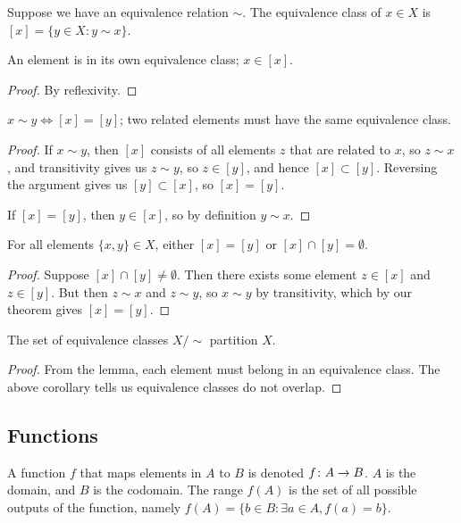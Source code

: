 \begin{definition}
    Suppose we have an equivalence relation \(\sim\).
    The equivalence class of \(x \in X\) is
    \([x] = \{y \in X : y \sim x\}\).
\end{definition}
\begin{lemma}
    An element is in its own equivalence class; \(x \in [x]\).
\end{lemma}
\begin{proof}
    By reflexivity.
\end{proof}
\begin{theorem}
    \(x \sim y \iff [x] = [y]\);
    two related elements must have the same equivalence class.
\end{theorem}
\begin{proof}
    If \(x \sim y\),
    then \([x]\) consists of all elements \(z\) that are related to \(x\),
    so \(z \sim x\), and transitivity gives us \(z \sim y\),
    so \(z \in [y]\), and hence \([x] \subset [y]\).
    Reversing the argument gives us \([y] \subset [x]\),
    so \([x] = [y]\).

    If \([x] = [y]\), then \(y \in [x]\),
    so by definition \(y \sim x\).
\end{proof}
\begin{corollary}
    For all elements \(\{x,y\} \in X\),
    either \([x] = [y]\) or \([x] \cap [y] = \emptyset\).
\end{corollary}
\begin{proof}
    Suppose \([x] \cap [y] \neq \emptyset\).
    Then there exists some element \(z \in [x]\) and \(z \in [y]\).
    But then \(z \sim x\) and \(z \sim y\),
    so \(x \sim y\) by transitivity,
    which by our theorem gives \([x] = [y]\).
\end{proof}

\begin{theorem}\label{thm:equiv-class-partition}
    The set of equivalence classes \(X/{\sim}\) partition \(X\).
\end{theorem}
\begin{proof}
    From the lemma,
    each element must belong in an equivalence class.
    The above corollary tells us equivalence classes do not overlap.
\end{proof}

\subsection{Functions}

\begin{definition}
    A function \(f\) that maps elements in \(A\) to \(B\)
    is denoted \(f\colon A\to B\).
    \(A\) is the domain, and \(B\) is the codomain.
    The range \(f(A)\) is the set of all possible outputs of the function,
    namely \(f(A) = \{b \in B : \exists a \in A, f(a) = b\}\).
\end{definition}

